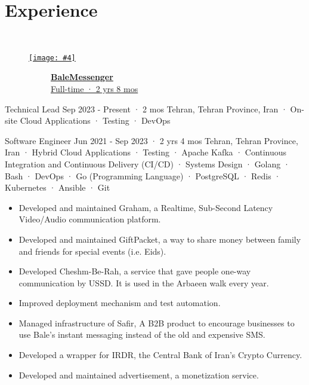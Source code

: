 \documentclass[a4paper,20pt]{article}
\newcommand{\companyHeadingWithImage}[4]{
    \vspace{-24pt}
    \begin{figure}[H]
        \href{#2}{\texttt{[image: \#4]}}
        \vspace{-37.5pt}
    \end{figure}
    ~~~~~~~~~~~\textbf{\href{#2}{#1}} \\
    ~~~~~~~~~~~\href{#2}{#3}
    \vspace{6pt}
}
\newcounter{mylist} %
\newenvironment{myitemize}{%
  \stepcounter{mylist}%
  \begin{itemize}
}{\end{itemize}%
  }
\begin{document}
\section{Experience}\
    \companyHeadingWithImage{BaleMessenger}{https://www.linkedin.com/company/balemessenger}{Full-time · 2 yrs 8 mos}{bale}
    \begin{myitemize}
        \begin{newexperience}                
            {Technical Lead}
            {Sep 2023 - Present · 2 mos}
            {Tehran, Tehran Province, Iran · On-site}
            {Cloud Applications · Testing · DevOps}
        \end{newexperience}

        \begin{newexperiencewithdesc}
            {Software Engineer}
            {Jun 2021 - Sep 2023 · 2 yrs 4 mos}
            {Tehran, Tehran Province, Iran · Hybrid}
            {Cloud Applications · Testing · Apache Kafka · Continuous Integration and Continuous Delivery (CI/CD) · Systems Design · Golang · Bash · DevOps · Go (Programming Language) · PostgreSQL · Redis · Kubernetes · Ansible · Git}
            {
                \begin{itemize}
                    \item Developed and maintained Graham, a Realtime, Sub-Second Latency Video/Audio communication platform.
                    \item Developed and maintained GiftPacket, a way to share money between family and friends for special events (i.e. Eids).
                    \item Developed Cheshm-Be-Rah, a service that gave people one-way communication by USSD. It is used in the Arbaeen walk every year.
                    \item Improved deployment mechanism and test automation.
                    \item Managed infrastructure of Safir, A B2B product to encourage 
                    businesses to use Bale's instant messaging instead of the old and 
                    expensive SMS.
                    \item Developed a wrapper for IRDR, the Central Bank of Iran's Crypto Currency.
                    \item Developed and maintained advertisement, a monetization service.
                \end{itemize}
            }
        \end{newexperiencewithdesc}


\end{myitemize}
\end{document}

